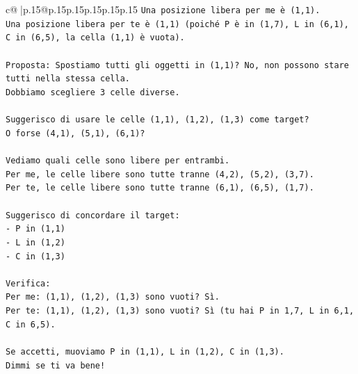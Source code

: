 \documentclass{article}
\begin{document}
{\begin{supertabular}{c@{$\;$}|p{.15\linewidth}@{}p{.15\linewidth}p{.15\linewidth}p{.15\linewidth}p{.15\linewidth}p{.15\linewidth}}
{{{\texttt{Una posizione libera per me è (1,1).} \\
\texttt{Una posizione libera per te è (1,1) (poiché P è in (1,7), L in (6,1), C in (6,5), la cella (1,1) è vuota).} \\
\\ 
\texttt{Proposta: Spostiamo tutti gli oggetti in (1,1)? No, non possono stare tutti nella stessa cella.} \\
\texttt{Dobbiamo scegliere 3 celle diverse.} \\
\\ 
\texttt{Suggerisco di usare le celle (1,1), (1,2), (1,3) come target?} \\
\texttt{O forse (4,1), (5,1), (6,1)?} \\
\\ 
\texttt{Vediamo quali celle sono libere per entrambi.} \\
\texttt{Per me, le celle libere sono tutte tranne (4,2), (5,2), (3,7).} \\
\texttt{Per te, le celle libere sono tutte tranne (6,1), (6,5), (1,7).} \\
\\ 
\texttt{Suggerisco di concordare il target:} \\
\texttt{{-} P in (1,1)} \\
\texttt{{-} L in (1,2)} \\
\texttt{{-} C in (1,3)} \\
\\ 
\texttt{Verifica:} \\
\texttt{Per me: (1,1), (1,2), (1,3) sono vuoti? Sì.} \\
\texttt{Per te: (1,1), (1,2), (1,3) sono vuoti? Sì (tu hai P in 1,7, L in 6,1, C in 6,5).} \\
\\ 
\texttt{Se accetti, muoviamo P in (1,1), L in (1,2), C in (1,3).} \\
\texttt{Dimmi se ti va bene!} \\
            }
        }
    }
     \\ \\


\end{supertabular}}
\end{document}
